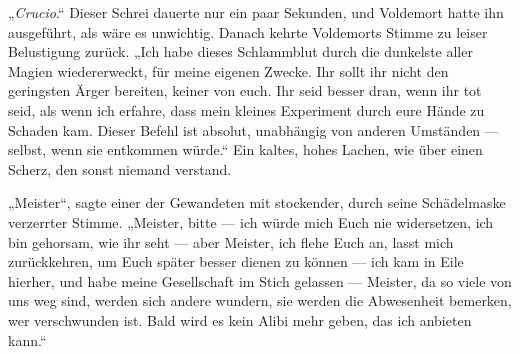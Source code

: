 „\emph{Crucio}.“
Dieser Schrei dauerte nur ein paar Sekunden, und Voldemort hatte ihn ausgeführt, als wäre es unwichtig. Danach kehrte Voldemorts Stimme zu leiser Belustigung zurück.
„Ich habe dieses Schlammblut durch die dunkelste aller Magien wiedererweckt, für meine eigenen Zwecke. Ihr sollt ihr nicht den geringsten Ärger bereiten, keiner von euch. Ihr seid besser dran, wenn ihr tot seid, als wenn ich erfahre, dass mein kleines Experiment durch eure Hände zu Schaden kam. Dieser Befehl ist absolut, unabhängig von anderen Umständen — selbst, wenn sie entkommen würde.“
Ein kaltes, hohes Lachen, wie über einen Scherz, den sonst niemand verstand.

„Meister“, sagte einer der Gewandeten mit stockender, durch seine Schädelmaske verzerrter Stimme.
„Meister, bitte — ich würde mich Euch nie widersetzen, ich bin gehorsam, wie ihr seht — aber Meister, ich flehe Euch an, lasst mich zurückkehren, um Euch später besser dienen zu können — ich kam in Eile hierher, und habe meine Gesellschaft im Stich gelassen — Meister, da so viele von uns weg sind, werden sich andere wundern, sie werden die Abwesenheit bemerken, wer verschwunden ist. Bald wird es kein Alibi mehr geben, das ich anbieten kann.“

